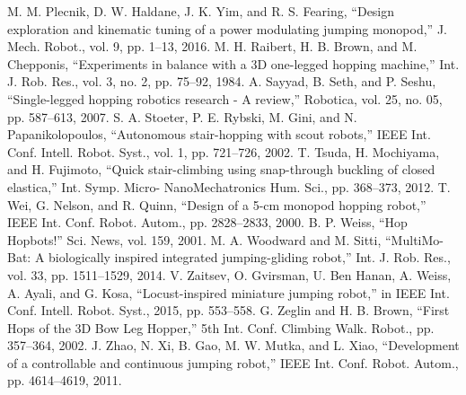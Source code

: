 \begin{translation}
[25] M. M. Plecnik, D. W. Haldane, J. K. Yim, and R. S. Fearing, “Design exploration and kinematic tuning of a power modulating jumping monopod,” J. Mech. Robot., vol. 9, pp. 1–13, 2016. \newline
[26] M. H. Raibert, H. B. Brown, and M. Chepponis, “Experiments in balance with a 3D one-legged hopping machine,” Int. J. Rob. Res., vol. 3, no. 2, pp. 75–92, 1984. \newline
[27] A. Sayyad, B. Seth, and P. Seshu, “Single-legged hopping robotics research - A review,” Robotica, vol. 25, no. 05, pp. 587–613, 2007. \newline
[28] S. A. Stoeter, P. E. Rybski, M. Gini, and N. Papanikolopoulos, “Autonomous stair-hopping with scout robots,” IEEE Int. Conf. Intell. Robot. Syst., vol. 1, pp. 721–726, 2002. \newline
[29] T. Tsuda, H. Mochiyama, and H. Fujimoto, “Quick stair-climbing using snap-through buckling of closed elastica,” Int. Symp. Micro- NanoMechatronics Hum. Sci., pp. 368–373, 2012. \newline
[30] T. Wei, G. Nelson, and R. Quinn, “Design of a 5-cm monopod hopping robot,” IEEE Int. Conf. Robot. Autom., pp. 2828–2833, 2000. \newline
[31] B. P. Weiss, “Hop Hopbots!” Sci. News, vol. 159, 2001. \newline
[32] M. A. Woodward and M. Sitti, “MultiMo-Bat: A biologically inspired integrated jumping-gliding robot,” Int. J. Rob. Res., vol. 33, pp. 1511–1529, 2014. \newline
[33] V. Zaitsev, O. Gvirsman, U. Ben Hanan, A. Weiss, A. Ayali, and G. Kosa, “Locust-inspired miniature jumping robot,” in IEEE Int.
Conf. Intell. Robot. Syst., 2015, pp. 553–558. \newline
[34] G. Zeglin and H. B. Brown, “First Hops of the 3D Bow Leg Hopper,” 5th Int. Conf. Climbing Walk. Robot., pp. 357–364, 2002. \newline
[35] J. Zhao, N. Xi, B. Gao, M. W. Mutka, and L. Xiao, “Development of a controllable and continuous jumping robot,” IEEE Int. Conf. Robot. Autom., pp. 4614–4619, 2011. \newline

\end{translation}
